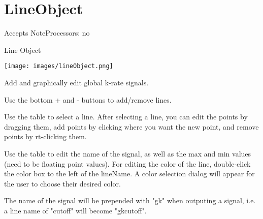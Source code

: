 \section{LineObject}\label{lineObject}

Accepts NoteProcessors: no

Line Object

\texttt{[image: images/lineObject.png]}

Add and graphically edit global k-rate signals.

Use the bottom + and - buttons to add/remove lines.

Use the table to select a line. After selecting a line, you can edit the
points by dragging them, add points by clicking where you want the new
point, and remove points by rt-clicking them.

Use the table to edit the name of the signal, as well as the max and min
values (need to be floating point values). For editing the color of the
line, double-click the color box to the left of the lineName. A color
selection dialog will appear for the user to choose their desired color.

The name of the signal will be prepended with "gk" when outputing a
signal, i.e. a line name of "cutoff" will become "gkcutoff".
